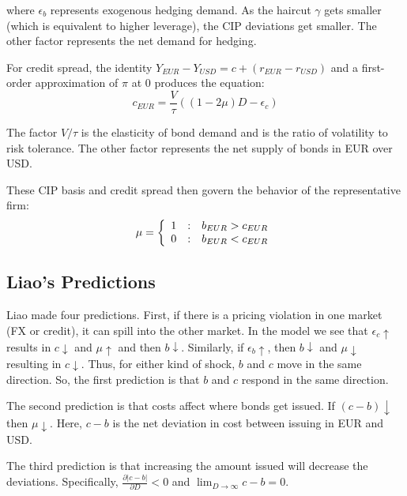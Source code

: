 \noindent where $\epsilon_b$ represents exogenous hedging demand.  As the haircut $\gamma$ gets smaller (which is equivalent to higher leverage), the CIP deviations get smaller.  The other factor represents the net demand for hedging.

For credit spread, the identity $Y_{EUR} - Y_{USD} = c + (r_{EUR} - r_{USD})$ and a first-order approximation of $\pi$ at 0 produces the equation:
\begin{equation}
  c_{EUR} = \frac{V}{\tau}( (1-2\mu)D - \epsilon_c) 
\end{equation}

\noindent The factor $V/\tau$ is the elasticity of bond demand and is the ratio of volatility to risk tolerance.  The other factor represents the net supply of bonds in EUR over USD. 

These CIP basis and credit spread then govern the behavior of the representative firm:
\begin{equation} 
  \mu = \left\{ \begin{array}{r@{\quad:\quad}l}
                                               1 & b_{EUR} > c_{EUR} \\ 
                                               0 & b_{EUR} < c_{EUR}
                          \end{array} \right.
\end{equation}


\subsection{Liao's Predictions}

Liao made four predictions.  First, \label{first_prediction} if there is a pricing violation in one market (FX or credit), it can spill into the other market.  In the model we see that $\epsilon_c \uparrow$ results in $c \downarrow$ and $ \mu \uparrow$ and then $b \downarrow$.  Similarly, if $\epsilon_b \uparrow$, then $b \downarrow$ and $ \mu \downarrow$ resulting in $c \downarrow$.  Thus, for either kind of shock, $b$ and $c$ move in the same direction.  So, the first prediction is that $b$ and $c$ respond in the same direction.

The second prediction is that costs affect where bonds get issued.  If $(c-b) \downarrow$ then $\mu \downarrow$.  Here, $c-b$ is the net deviation in cost between issuing in EUR and USD.

The third prediction is that increasing the amount issued will decrease the deviations.  Specifically, $\frac{\partial |c-b|}{\partial D} < 0$ and $\lim_{D \to \infty} c-b = 0$.  

